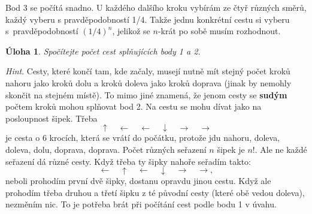 \documentclass[a4paper,11pt]{article}
\newtheorem*{problem}{Úloha}
\theoremstyle{remark}
\begin{document}
Bod 3 se počítá snadno. U každého dalšího kroku vybírám ze čtyř různých směrů,
každý vyberu s pravděpodobností 1/4. Takže jednu konkrétní cestu si vyberu
s~pravděpodobností $(1 / 4)^{n}$, jelikož se $n$-krát po sobě musím 
rozhodnout.

\begin{problem}
 Spočítejte počet cest splňujících body 1 a 2.
\end{problem}
\emph{Hint}. Cesty, které končí tam, kde začaly, musejí nutně mít stejný počet
kroků nahoru jako kroků dolu a kroků doleva jako kroků doprava (jinak by nemohly
skončit na stejném místě). To mimo jiné znamená, že jenom cesty se
\textbf{sudým} počtem kroků mohou splňovat bod 2. Na cestu se mohu dívat jako na
posloupnost šipek. Třeba
\[
 \uparrow \quad \leftarrow \quad \leftarrow \quad \downarrow \quad \rightarrow
 \quad \rightarrow
\]
je cesta o 6 krocích, která se vrátí do počátku, protože jdu nahoru, doleva,
doleva, dolu, doprava, doprava. Počet různých seřazení $n$ šipek je $n!$. Ale ne
každé seřazení dá různé cesty. Když třeba ty šipky nahoře seřadím takto:
\[
 \leftarrow \quad \uparrow \quad \leftarrow \quad \downarrow \quad \rightarrow
 \quad \rightarrow,
\]
neboli prohodím první dvě šipky, dostanu opravdu jinou cestu. Když ale prohodím
třeba druhou a třetí šipku z té původní cesty (které obě vedou doleva), nezměním
nic. To je potřeba brát při počítání cest podle bodu 1 v úvahu.
\end{document}
